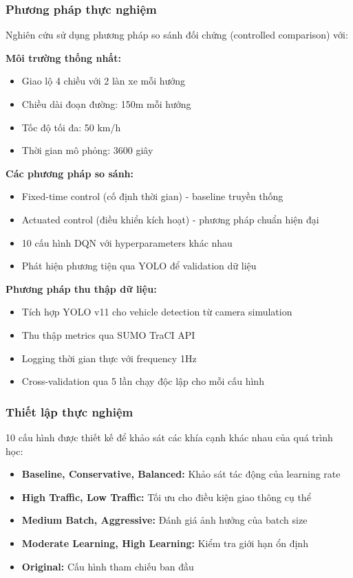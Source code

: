 \subsubsection{Phương pháp thực nghiệm}
Nghiên cứu sử dụng phương pháp so sánh đối chứng (controlled comparison) với:

\textbf{Môi trường thống nhất:}
\begin{itemize}
    \item Giao lộ 4 chiều với 2 làn xe mỗi hướng
    \item Chiều dài đoạn đường: 150m mỗi hướng
    \item Tốc độ tối đa: 50 km/h
    \item Thời gian mô phỏng: 3600 giây
\end{itemize}

\textbf{Các phương pháp so sánh:}
\begin{itemize}
    \item Fixed-time control (cố định thời gian) - baseline truyền thống
    \item Actuated control (điều khiển kích hoạt) - phương pháp chuẩn hiện đại
    \item 10 cấu hình DQN với hyperparameters khác nhau
    \item Phát hiện phương tiện qua YOLO để validation dữ liệu
\end{itemize}

\textbf{Phương pháp thu thập dữ liệu:}
\begin{itemize}
    \item Tích hợp YOLO v11 cho vehicle detection từ camera simulation
    \item Thu thập metrics qua SUMO TraCI API
    \item Logging thời gian thực với frequency 1Hz
    \item Cross-validation qua 5 lần chạy độc lập cho mỗi cấu hình
\end{itemize}

\subsubsection{Thiết lập thực nghiệm}
10 cấu hình được thiết kế để khảo sát các khía cạnh khác nhau của quá trình học:
\begin{itemize}
    \item \textbf{Baseline, Conservative, Balanced:} Khảo sát tác động của learning rate
    \item \textbf{High Traffic, Low Traffic:} Tối ưu cho điều kiện giao thông cụ thể
    \item \textbf{Medium Batch, Aggressive:} Đánh giá ảnh hưởng của batch size
    \item \textbf{Moderate Learning, High Learning:} Kiểm tra giới hạn ổn định
    \item \textbf{Original:} Cấu hình tham chiếu ban đầu
\end{itemize}

